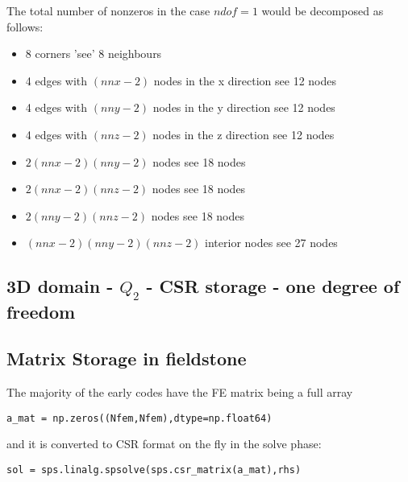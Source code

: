 \begin{center}

\end{center}



The total number of nonzeros in the case $ndof=1$ would be decomposed as follows:
\begin{itemize}
\item 8 corners 'see' 8 neighbours
\item 4 edges with $(nnx-2)$ nodes in the x direction see 12 nodes
\item 4 edges with $(nny-2)$ nodes in the y direction see 12 nodes
\item 4 edges with $(nnz-2)$ nodes in the z direction see 12 nodes
\item $2(nnx-2)(nny-2)$ nodes see 18 nodes
\item $2(nnx-2)(nnz-2)$ nodes see 18 nodes
\item $2(nny-2)(nnz-2)$ nodes see 18 nodes
\item $(nnx-2)(nny-2)(nnz-2)$ interior nodes see 27 nodes
\end{itemize}

\subsection{3D domain - $Q_2$ - CSR storage - one degree of freedom}


\begin{center}

\end{center}





\subsection{Matrix Storage in fieldstone}

The majority of the early codes have the FE matrix being a full array
\begin{lstlisting}
a_mat = np.zeros((Nfem,Nfem),dtype=np.float64) 
\end{lstlisting}
and it is converted to CSR format on the fly in the solve phase:
\begin{lstlisting}
sol = sps.linalg.spsolve(sps.csr_matrix(a_mat),rhs)
\end{lstlisting}

